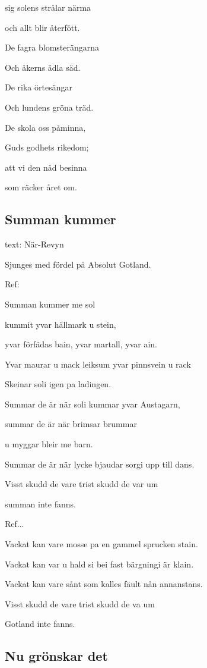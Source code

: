 sig solens strålar närma

och allt blir återfött. 

De fagra blomsterängarna

Och åkerns ädla säd.

De rika örtesängar

Och lundens gröna träd.

De skola oss påminna,

Guds godhets rikedom;

att vi den nåd besinna

som räcker året om. 

\subsection{\textbf{Summan kummer}}

text: När-Revyn\bigskip


Sjunges med fördel på Absolut Gotland.\bigskip

Ref:

Summan kummer me sol

kummit yvar hällmark u stein,

yvar förfädas bain, yvar martall, yvar ain.

Yvar maurar u mack leiksum yvar pinnsvein u rack

Skeinar soli igen pa ladingen.\bigskip


Summar de är när soli kummar yvar Austagarn,

summar de är när brimsar brummar

u myggar bleir me barn.

Summar de är när lycke bjaudar sorgi upp till dans.

Visst skudd de vare trist skudd de var um

summan inte fanns.\bigskip


Ref...\bigskip


Vackat kan vare mosse pa en gammel sprucken stain.

Vackat kan var u hald si bei fast bärgningi är klain.

Vackat kan vare sånt som kalles fäult nån annanstans.

Visst skudd de vare trist skudd de va um

Gotland inte fanns. \bigskip


\subsection{\textbf{Nu grönskar det }}

